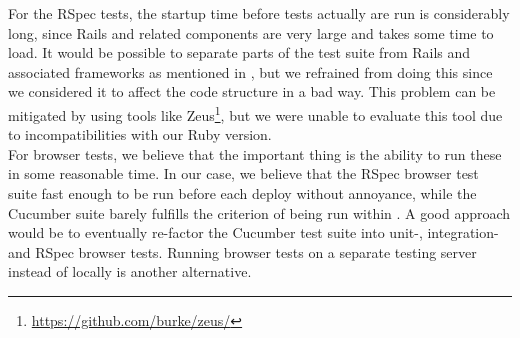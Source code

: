For the RSpec tests, the startup time before tests actually are run is
considerably long, since Rails and related components are very large and
takes some time to load. It would be possible to separate parts of the
test suite from Rails and associated frameworks as mentioned in
, but we refrained from doing this since we
considered it to affect the code structure in a bad way. This problem
can be mitigated by using tools like
Zeus\footnote{\url{https://github.com/burke/zeus/}}, but we were unable
to evaluate this tool due to incompatibilities with our Ruby version.\\

For browser tests, we believe that the important thing is the ability to
run these in some reasonable time. In our case, we believe that the
RSpec browser test suite fast enough to be run before each deploy
without annoyance, while the Cucumber suite barely fulfills the
criterion of being run within . A good approach
would be to eventually re-factor the Cucumber test suite into unit-,
integration- and RSpec browser tests. Running browser tests on a
separate testing server instead of locally is another alternative.\\

